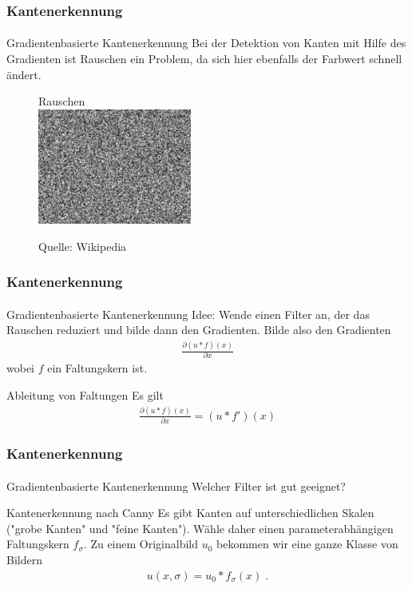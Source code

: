\documentclass{beamer}
\begin{document}
\begin{frame}
    \frametitle{Kantenerkennung}
\framesubtitle{}
\begin{block}{Gradientenbasierte Kantenerkennung}
Bei der Detektion von Kanten mit Hilfe des Gradienten ist   Rauschen ein Problem, da sich  hier ebenfalls  der Farbwert schnell ändert. 
\end{block}
\begin{figure}[htp]
      \centering
Rauschen \\
    \includegraphics[width=0.45\textwidth]{images/noise} 
      \caption{Quelle: Wikipedia}
\end{figure}

 \end{frame}

\begin{frame}
    \frametitle{Kantenerkennung}
\framesubtitle{}
\begin{block}{Gradientenbasierte Kantenerkennung}
Idee: Wende einen Filter an, der das Rauschen reduziert und bilde dann den Gradienten. Bilde also den Gradienten
\begin{align*}
\frac{\partial (u * f)(x)}{\partial x} 
\end{align*}
wobei $f$ ein Faltungskern ist.
\end{block}

\begin{block}{Ableitung von Faltungen}
Es gilt
\begin{align*}
\frac{\partial (u * f)(x)}{\partial x} = (u * f')(x)
\end{align*}

\end{block}

 \end{frame}


\begin{frame}
    \frametitle{Kantenerkennung}
\framesubtitle{}
\begin{block}{Gradientenbasierte Kantenerkennung}
Welcher Filter ist gut geeignet?
\end{block}
\begin{block}{Kantenerkennung nach Canny}
Es gibt Kanten auf unterschiedlichen Skalen ("grobe Kanten" und "feine Kanten"). Wähle daher einen parameterabhängigen Faltungskern
$f_\sigma$. Zu einem Originalbild $u_0$ bekommen wir eine ganze Klasse von Bildern
\begin{align*}
u(x, \sigma) = u_0 * f_\sigma(x) \;.
\end{align*}
 \end{block}

 \end{frame}
\end{document}

